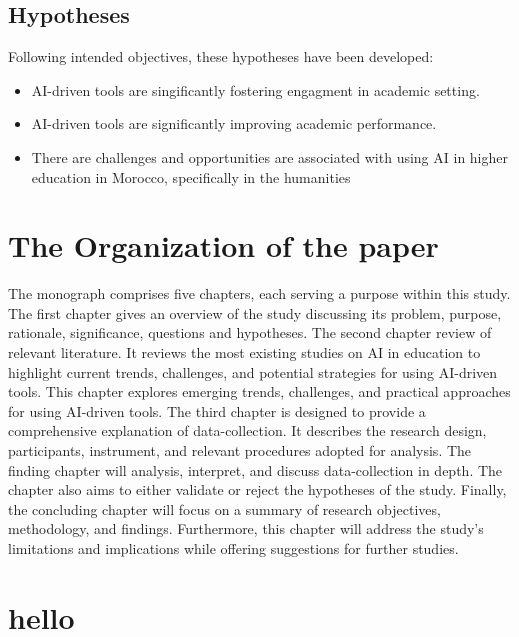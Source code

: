 \subsection{Hypotheses}\label{subsec:hypotheses}
\justifying
\noindent
Following intended objectives, these hypotheses have been developed:
\begin{itemize}
	\item AI-driven tools are singificantly fostering engagment in academic setting.
	\item AI-driven tools are significantly improving academic performance.
	\item There are challenges and opportunities are associated with using AI in higher education
	      in Morocco, specifically in the humanities
\end{itemize}



\section{The Organization of the paper}\label{sec:the-organization-of-the-paper}
\justifying
The monograph comprises five chapters, each serving a purpose within this study.
The first chapter gives an overview of the study discussing its problem,
purpose, rationale, significance, questions and hypotheses.
The second chapter review of relevant literature.
It reviews the most existing studies on AI in education to highlight current
trends, challenges, and potential strategies for using AI-driven tools.
This chapter explores emerging trends, challenges, and practical approaches for using AI-driven tools.
The third chapter is designed to provide a comprehensive explanation of data-collection.
It describes the research design, participants, instrument, and relevant procedures
adopted for analysis.
The finding chapter will analysis, interpret, and discuss data-collection in depth.
The chapter also aims to either validate or reject the hypotheses of the study.
Finally, the concluding chapter will focus on a summary of research objectives, methodology, and findings.
Furthermore,
this chapter will address the study's limitations and implications while offering suggestions for further studies.

\section{hello}
